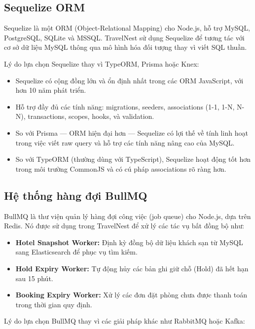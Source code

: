 \documentclass[13pt,a4paper,twoside]{report}
\begin{document}
\subsection{Sequelize ORM}

Sequelize là một ORM (Object-Relational Mapping) cho Node.js, hỗ trợ MySQL, PostgreSQL, SQLite và MSSQL. TravelNest sử dụng Sequelize để tương tác với cơ sở dữ liệu MySQL thông qua mô hình hóa đối tượng thay vì viết SQL thuần.

Lý do lựa chọn Sequelize thay vì TypeORM, Prisma hoặc Knex:

\begin{itemize}
  \item Sequelize có cộng đồng lớn và ổn định nhất trong các ORM JavaScript, với hơn 10 năm phát triển.
  \item Hỗ trợ đầy đủ các tính năng: migrations, seeders, associations (1-1, 1-N, N-N), transactions, scopes, hooks, và validation.
  \item So với Prisma --- ORM hiện đại hơn --- Sequelize có lợi thế về tính linh hoạt trong việc viết raw query và hỗ trợ các tính năng nâng cao của MySQL.
  \item So với TypeORM (thường dùng với TypeScript), Sequelize hoạt động tốt hơn trong môi trường CommonJS và có cú pháp associations rõ ràng hơn.
\end{itemize}

\subsection{Hệ thống hàng đợi BullMQ}

BullMQ là thư viện quản lý hàng đợi công việc (job queue) cho Node.js, dựa trên Redis. Nó được sử dụng trong TravelNest để xử lý các tác vụ bất đồng bộ như:

\begin{itemize}
  \item \textbf{Hotel Snapshot Worker:} Định kỳ đồng bộ dữ liệu khách sạn từ MySQL sang Elasticsearch để phục vụ tìm kiếm.
  \item \textbf{Hold Expiry Worker:} Tự động hủy các bản ghi giữ chỗ (Hold) đã hết hạn sau 15 phút.
  \item \textbf{Booking Expiry Worker:} Xử lý các đơn đặt phòng chưa được thanh toán trong thời gian quy định.
\end{itemize}

Lý do lựa chọn BullMQ thay vì các giải pháp khác như RabbitMQ hoặc Kafka:
\end{document}
